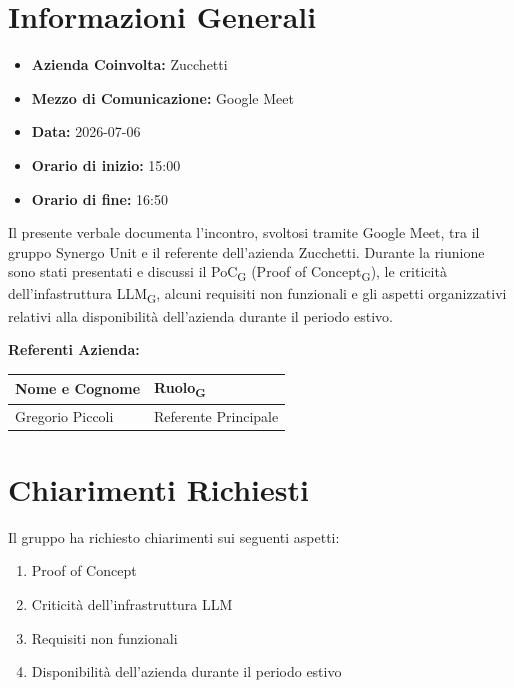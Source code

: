 \section{Informazioni Generali}
\begin{itemize}
	\item \textbf{Azienda Coinvolta:} Zucchetti
	\item \textbf{Mezzo di Comunicazione:} Google Meet
	\item \textbf{Data:} 2026-07-06
	\item \textbf{Orario di inizio:} 15:00
	\item \textbf{Orario di fine:} 16:50
\end{itemize}

Il presente verbale documenta l’incontro, svoltosi tramite Google Meet, 
tra il gruppo Synergo Unit e il referente dell’azienda Zucchetti. 
Durante la riunione sono stati presentati e discussi il PoC\textsubscript{G} (Proof of Concept\textsubscript{G}), le criticità dell'infastruttura LLM\textsubscript{G}, alcuni requisiti non funzionali e gli aspetti organizzativi relativi alla disponibilità dell'azienda durante il periodo estivo.



\vspace{0.5cm}
\textbf{Referenti Azienda:}
\begin{table}[ht]
	\centering
	\renewcommand{\arraystretch}{1.2}
	\begin{tabularx}{\textwidth}{X l}
		\toprule
		\textbf{Nome e Cognome} & \textbf{Ruolo\textsubscript{G}} \\
		\midrule
		Gregorio Piccoli & Referente Principale \\
		\bottomrule
	\end{tabularx}
\end{table}

\section{Chiarimenti Richiesti}
Il gruppo ha richiesto chiarimenti sui seguenti aspetti:

\begin{enumerate}
	\item Proof of Concept
	\item Criticità dell'infrastruttura LLM
	\item Requisiti non funzionali
	\item Disponibilità dell'azienda durante il periodo estivo
\end{enumerate}

